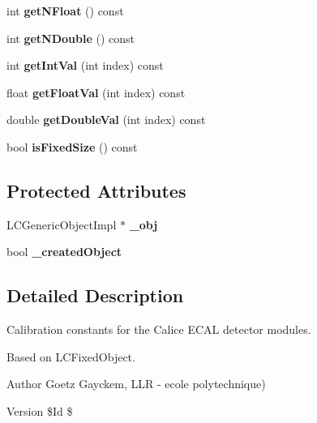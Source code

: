 \begin{DoxyCompactItemize}
\item 
int {\bfseries get\-N\-Float} () const \label{classCALICE_1_1EcalModuleCalibration_ad5cfd49be32643de01c52ef1a6866401}

\item 
int {\bfseries get\-N\-Double} () const \label{classCALICE_1_1EcalModuleCalibration_aaca3fb44be479000b015e25456138414}

\item 
int {\bfseries get\-Int\-Val} (int index) const \label{classCALICE_1_1EcalModuleCalibration_a23c124642eb6c3fa13d7a6a1bad86b55}

\item 
float {\bfseries get\-Float\-Val} (int index) const \label{classCALICE_1_1EcalModuleCalibration_ad184e2ba9450fec25ce4bc91dc7d16e3}

\item 
double {\bfseries get\-Double\-Val} (int index) const \label{classCALICE_1_1EcalModuleCalibration_a0bea8bda97e2024bcf32345cb69b21aa}

\item 
bool {\bfseries is\-Fixed\-Size} () const \label{classCALICE_1_1EcalModuleCalibration_af56b25b11b910b8ceebd00758ef085b4}

\end{DoxyCompactItemize}
\subsection*{Protected Attributes}
\begin{DoxyCompactItemize}
\item 
L\-C\-Generic\-Object\-Impl $\ast$ {\bfseries \-\_\-obj}\label{classCALICE_1_1EcalModuleCalibration_a3632376ffd5eee52d71c53faac4ce087}

\item 
bool {\bfseries \-\_\-created\-Object}\label{classCALICE_1_1EcalModuleCalibration_af6aee165852f21a5152c3d5645410bae}

\end{DoxyCompactItemize}


\subsection{Detailed Description}
Calibration constants for the Calice E\-C\-A\-L detector modules. 

Based on L\-C\-Fixed\-Object. \begin{DoxyAuthor}{Author}
Goetz Gayckem, L\-L\-R -\/ ecole polytechnique) 
\end{DoxyAuthor}
\begin{DoxyVersion}{Version}
\$\-Id \$ 
\end{DoxyVersion}


